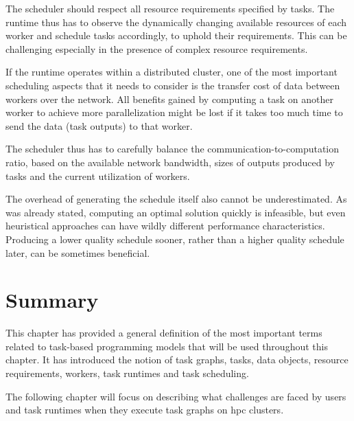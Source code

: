 \begin{description}[wide=0pt,itemsep=0pt,topsep=4pt]
	\item[Resource requirements] The scheduler should respect all resource requirements specified by tasks. The runtime thus has to
		observe the dynamically changing available resources of each worker and schedule tasks accordingly,
		to uphold their requirements. This can be challenging especially in the presence of complex
		resource requirements.
	\item[Data transfer cost] If the runtime operates within a distributed cluster, one of the most important scheduling aspects
		that it needs to consider is the transfer cost of data between workers over the network. All
		benefits gained by computing a task on another worker to achieve more parallelization might be lost
		if it takes too much time to send the data (task outputs) to that worker.

		The scheduler thus has to carefully balance the communication-to-computation ratio, based on the
		available network bandwidth, sizes of outputs produced by tasks and the current utilization of
		workers.
	\item[Scheduling overhead] The overhead of generating the schedule itself also cannot be underestimated. As was already
		stated, computing an optimal solution quickly is infeasible, but even heuristical approaches can
		have wildly different performance characteristics. Producing a lower quality schedule sooner,
		rather than a higher quality schedule later, can be sometimes beneficial.
\end{description}

\section*{Summary}
This chapter has provided a general definition of the most important terms related to task-based
programming models that will be used throughout this chapter. It has introduced the notion of task
graphs, tasks, data objects, resource requirements, workers, task runtimes and task scheduling.

The following chapter will focus on describing what challenges are faced by users and task runtimes
when they execute task graphs on \gls{hpc} clusters.
